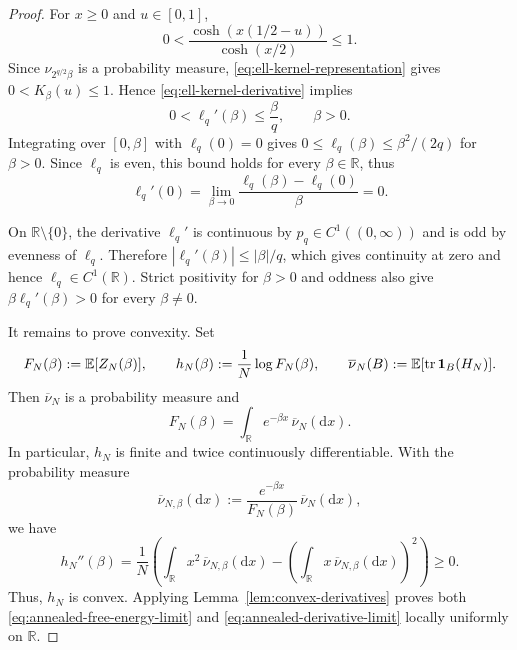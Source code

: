 \documentclass[../CLT_SYK.tex]{subfiles}
\begin{document}
\begin{proof}
    For $x\geq0$ and $u\in[0,1]$,
    \begin{equation*}
        0<\frac{\cosh(x(1/2-u))}{\cosh(x/2)}\leq1.
    \end{equation*}
    Since $\nu_{2^{q/2}\beta}$ is a probability measure,
    \eqref{eq:ell-kernel-representation} gives $0<K_\beta(u)\leq1$.
    Hence \eqref{eq:ell-kernel-derivative} implies
    \begin{equation*}
        0<\ell_q'(\beta)\leq\frac\beta q, 
        \qquad \beta>0.
    \end{equation*}
    Integrating over $[0,\beta]$ with $\ell_q(0)=0$ 
    {gives} $0\leq\ell_q(\beta)\leq\beta^2/(2q)$ for $\beta>0$.
    Since $\ell_q$ is even, this bound holds for every $\beta\in\mathbb R$, thus 
    \begin{equation*}
        \ell_q'(0)= \lim_{\beta\to0}
        \frac{\ell_q(\beta)-\ell_q(0)}{\beta}=0.
    \end{equation*}

On $\mathbb R\setminus\{0\}$, the derivative
    $\ell_q'$ is continuous by $p_q\in C^1((0,\infty))$ and is odd
    by evenness of $\ell_q$. Therefore
    $|\ell_q'(\beta)|\leq|\beta|/q$, which gives continuity at zero
    and hence $\ell_q\in C^1(\mathbb R)$.
    Strict positivity for $\beta>0$ and oddness also give
    $\beta\ell_q'(\beta)>0$ for every $\beta\neq0$.

It remains to prove convexity. 
    Set
    \begin{equation*}
        F_N(\beta):=\mathbb E[Z_N(\beta)],
        \qquad
        h_N(\beta):=\frac1N\log F_N(\beta),
        \qquad
        \overline\nu_N(B):=\mathbb E[\operatorname{tr}\mathbf1_B(H_N)].
    \end{equation*}
    Then $\overline\nu_N$ is a probability measure and
    \begin{equation*}
        F_N(\beta)=\int_{\mathbb R}e^{-\beta x}\,
        \overline\nu_N(\mathrm dx).
    \end{equation*}
 In particular,
    $h_N$ is finite and twice continuously differentiable.  With the
    probability measure
    \begin{equation*}
        \overline\nu_{N,\beta}(\mathrm dx)
        :=\frac{e^{-\beta x}}{F_N(\beta)}\,
        \overline\nu_N(\mathrm dx),
    \end{equation*}
    we have
    \begin{equation*}
        h_N''(\beta)
        =\frac1N\left(
            \int_{\mathbb R}x^2\,\overline\nu_{N,\beta}(\mathrm dx)
            -\left(\int_{\mathbb R}x\,
            \overline\nu_{N,\beta}(\mathrm dx)\right)^2
        \right)\geq0.
    \end{equation*}
    Thus, $h_N$ is convex. 
    Applying Lemma~\ref{lem:convex-derivatives} proves
    both \eqref{eq:annealed-free-energy-limit} and
    \eqref{eq:annealed-derivative-limit} locally uniformly on $\mathbb R$.
\end{proof}
\end{document}
